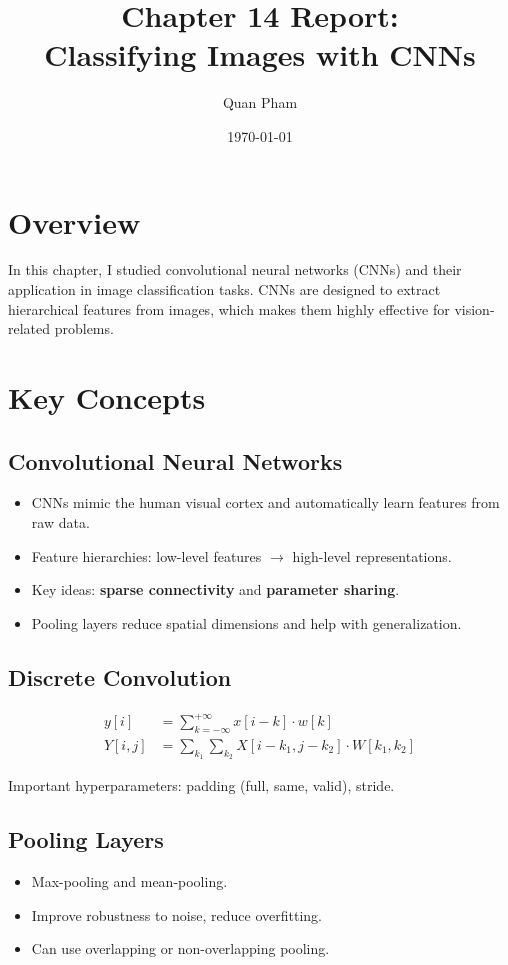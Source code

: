 \documentclass[12pt]{article}
\title{Chapter 14 Report: \\ Classifying Images with CNNs}
\author{Quan Pham}
\date{\today}
\begin{document}
\maketitle
\tableofcontents
\newpage

\section{Overview}
In this chapter, I studied convolutional neural networks (CNNs) and their application in image classification tasks. CNNs are designed to extract hierarchical features from images, which makes them highly effective for vision-related problems.

\section{Key Concepts}

\subsection{Convolutional Neural Networks}
\begin{itemize}[topsep=0pt]
    \item CNNs mimic the human visual cortex and automatically learn features from raw data.
    \item Feature hierarchies: low-level features $\rightarrow$ high-level representations.
    \item Key ideas: \textbf{sparse connectivity} and \textbf{parameter sharing}.
    \item Pooling layers reduce spatial dimensions and help with generalization.
\end{itemize}

\subsection{Discrete Convolution}
\begin{align*}
y[i] &= \sum_{k=-\infty}^{+\infty} x[i-k] \cdot w[k] \\
Y[i,j] &= \sum_{k_1} \sum_{k_2} X[i-k_1, j-k_2] \cdot W[k_1, k_2]
\end{align*}

\noindent
Important hyperparameters: padding (full, same, valid), stride.

\subsection{Pooling Layers}
\begin{itemize}
    \item Max-pooling and mean-pooling.
    \item Improve robustness to noise, reduce overfitting.
    \item Can use overlapping or non-overlapping pooling.
\end{itemize}
\end{document}
